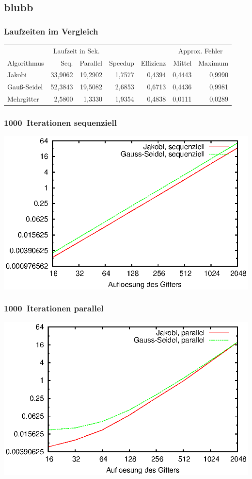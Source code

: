 \documentclass{beamer}
\begin{document}
\subsection*{blubb}
\begin{frame}
    \frametitle{Laufzeiten im Vergleich}
    \footnotesize
    \begin{tabular}{|l|r|r|r|r|r|r|} \hline
    & \multicolumn{2}{c|}{Laufzeit in Sek.} & & & \multicolumn{2}{c|}{Approx. Fehler} \\
    Algorithmus & Seq.    & Parallel & Speedup & Effizienz & Mittel   & Maximum \\ \hline \hline
    Jakobi      & 33,9062 & 19,2902  & 1,7577  & 0,4394    & 0,4443   & 0,9990  \\
    Gauß-Seidel & 52,3843 & 19,5082  & 2,6853  & 0,6713    & 0,4436   & 0,9981  \\
    Mehrgitter  & 2,5800  & 1,3330   & 1,9354  & 0,4838    & 0,0111   & 0,0289  \\ \hline
    \end{tabular}
\end{frame}

\begin{frame}
    \frametitle{1000~Iterationen sequenziell}
    \includegraphics[width=\textwidth]{plots/laufzeitensequenziell}
\end{frame}

\begin{frame}
    \frametitle{1000~Iterationen parallel}
    \includegraphics[width=\textwidth]{plots/laufzeitenparallel}
\end{frame}
\end{document}

